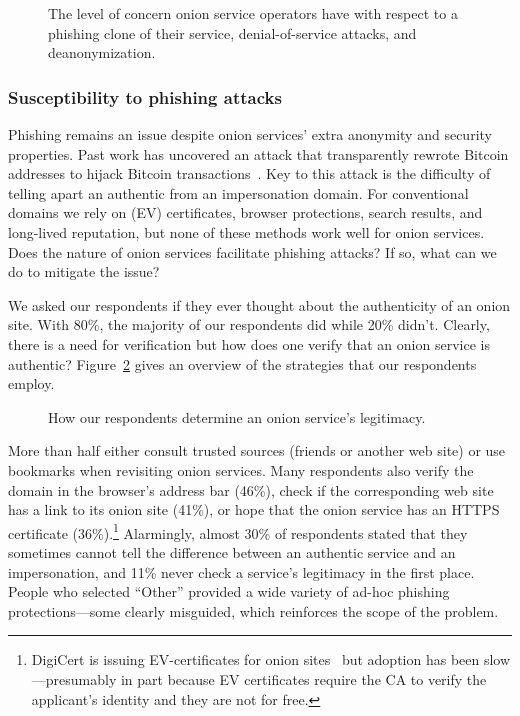 \begin{figure}[t]
    \centering
    
    \caption{The level of concern onion service operators have with respect to a
    phishing clone of their service, denial-of-service attacks, and
    deanonymization.}
    \label{fig:onion-operation-concerns}
\end{figure}

\subsubsection{Susceptibility to phishing attacks}

Phishing remains an issue despite onion services' extra anonymity and security
properties.  Past work has uncovered an attack that transparently rewrote
Bitcoin addresses to hijack Bitcoin
transactions~\cite{Winter2016a,Nurmi2015a,Monteiro2016a}.  Key to this attack is
the difficulty of telling apart an authentic from an impersonation domain.  For
conventional domains we rely on (EV) certificates, browser protections, search
results, and long-lived reputation, but none of these methods work well for
onion services.  Does the nature of onion services facilitate phishing attacks?
If so, what can we do to mitigate the issue?

We asked our respondents if they ever thought about the authenticity of an onion
site.  With 80\%, the majority of our respondents did while 20\% didn't.
Clearly, there is a need for verification but how does one verify that an onion
service is authentic?  Figure~\ref{fig:determining-legitimacy} gives an overview
of the strategies that our respondents employ.

\begin{figure}[t]
    \centering
    
    \caption{How our respondents determine an onion service's legitimacy.}
    \label{fig:determining-legitimacy}
\end{figure}

More than half either consult trusted sources (\eg friends or another web site)
or use bookmarks when revisiting onion services.  Many respondents also verify
the domain in the browser's address bar (46\%), check if the corresponding web
site has a link to its onion site (41\%), or hope that the onion service has an
HTTPS certificate (36\%).\footnote{DigiCert is issuing EV-certificates for onion
sites~\cite{DigiCert2015a} but adoption has been slow---presumably in part
because EV certificates require the CA to verify the applicant's identity
and they are not for free.}  Alarmingly, almost 30\% of respondents stated that
they sometimes cannot tell the difference between an authentic service and an
impersonation, and 11\% never check a service's legitimacy in the first place.
People who selected ``Other'' provided a wide variety of ad-hoc phishing
protections---some clearly misguided, which reinforces the scope of the problem.

